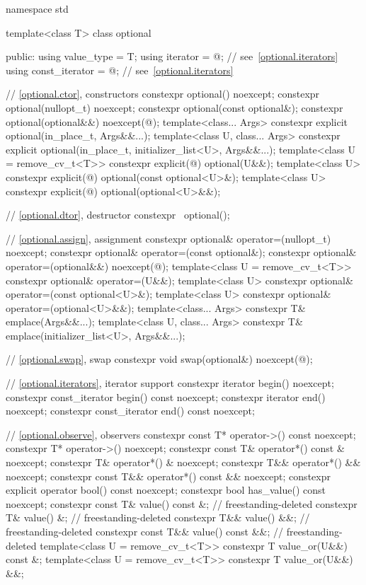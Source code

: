 %
%
\begin{codeblock}
namespace std {
  template<class T>
  class optional {
  public:
    using value_type     = T;
    using iterator       = @\impdefnc@;              // see~\ref{optional.iterators}
    using const_iterator = @\impdefnc@;              // see~\ref{optional.iterators}

    // \ref{optional.ctor}, constructors
    constexpr optional() noexcept;
    constexpr optional(nullopt_t) noexcept;
    constexpr optional(const optional&);
    constexpr optional(optional&&) noexcept(@\seebelow@);
    template<class... Args>
      constexpr explicit optional(in_place_t, Args&&...);
    template<class U, class... Args>
      constexpr explicit optional(in_place_t, initializer_list<U>, Args&&...);
    template<class U = remove_cv_t<T>>
      constexpr explicit(@\seebelow@) optional(U&&);
    template<class U>
      constexpr explicit(@\seebelow@) optional(const optional<U>&);
    template<class U>
      constexpr explicit(@\seebelow@) optional(optional<U>&&);

    // \ref{optional.dtor}, destructor
    constexpr ~optional();

    // \ref{optional.assign}, assignment
    constexpr optional& operator=(nullopt_t) noexcept;
    constexpr optional& operator=(const optional&);
    constexpr optional& operator=(optional&&) noexcept(@\seebelow@);
    template<class U = remove_cv_t<T>> constexpr optional& operator=(U&&);
    template<class U> constexpr optional& operator=(const optional<U>&);
    template<class U> constexpr optional& operator=(optional<U>&&);
    template<class... Args> constexpr T& emplace(Args&&...);
    template<class U, class... Args> constexpr T& emplace(initializer_list<U>, Args&&...);

    // \ref{optional.swap}, swap
    constexpr void swap(optional&) noexcept(@\seebelow@);

    // \ref{optional.iterators}, iterator support
    constexpr iterator begin() noexcept;
    constexpr const_iterator begin() const noexcept;
    constexpr iterator end() noexcept;
    constexpr const_iterator end() const noexcept;

    // \ref{optional.observe}, observers
    constexpr const T* operator->() const noexcept;
    constexpr T* operator->() noexcept;
    constexpr const T& operator*() const & noexcept;
    constexpr T& operator*() & noexcept;
    constexpr T&& operator*() && noexcept;
    constexpr const T&& operator*() const && noexcept;
    constexpr explicit operator bool() const noexcept;
    constexpr bool has_value() const noexcept;
    constexpr const T& value() const &;                                 // freestanding-deleted
    constexpr T& value() &;                                             // freestanding-deleted
    constexpr T&& value() &&;                                           // freestanding-deleted
    constexpr const T&& value() const &&;                               // freestanding-deleted
    template<class U = remove_cv_t<T>> constexpr T value_or(U&&) const &;
    template<class U = remove_cv_t<T>> constexpr T value_or(U&&) &&;

}}
\end{codeblock}
